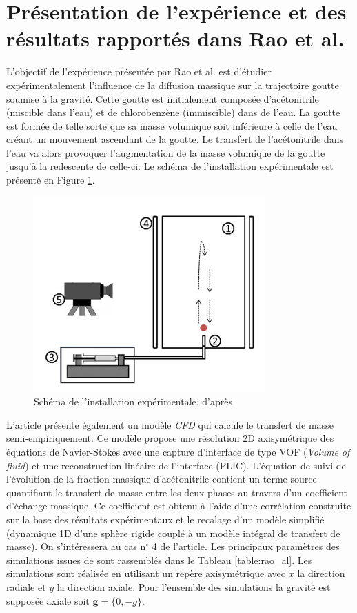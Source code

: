 \section{Présentation de l'expérience et des résultats rapportés dans Rao et al.  \cite{rao_influence_2015}} \label{sec:presExp}
L'objectif de l'expérience présentée par Rao et al. est d'étudier expérimentalement l'influence de la diffusion massique sur la trajectoire goutte soumise à la gravité. Cette goutte est initialement composée d'acétonitrile (miscible dans l'eau) et de chlorobenzène (immiscible) dans de l'eau. La goutte est formée de telle sorte que sa masse volumique soit inférieure à celle de l'eau créant un mouvement ascendant de la goutte. Le transfert de l'acétonitrile dans l'eau va alors provoquer l'augmentation de la masse volumique de la goutte jusqu'à la redescente de celle-ci. Le schéma de l'installation expérimentale est présenté en Figure \ref{fig:exp}.
\begin{figure}[H]
	\centering
	\includegraphics[width=0.3\linewidth]{figure/exp}
	\caption{Schéma de l'installation expérimentale, d'après \cite{rao_influence_2015}}
	\label{fig:exp}
\end{figure}
L'article présente également un modèle \textit{CFD} qui calcule le transfert de masse semi-empiriquement. Ce modèle propose une résolution 2D axisymétrique des équations de Navier-Stokes avec une capture d'interface de type VOF (\textit{Volume of fluid}) et une reconstruction linéaire de l'interface (PLIC). L'équation de suivi de l'évolution de la fraction massique d'acétonitrile contient un terme source quantifiant le transfert de masse entre les deux phases au travers d'un coefficient d'échange massique. Ce coefficient est obtenu à l'aide d'une corrélation construite sur la base des résultats expérimentaux et le recalage d'un modèle simplifié (dynamique 1D d'une sphère rigide couplé à un modèle intégral de transfert de masse). On s'intéressera au cas n$^\circ$ 4 de l'article. Les principaux paramètres des simulations issues de \cite{rao_influence_2015} sont rassemblés dans le Tableau \ref{table:rao_al}. Les simulations sont réalisée en utilisant un repère axisymétrique avec $x$ la direction radiale et $y$ la direction axiale. Pour l'ensemble des simulations la gravité est supposée axiale soit $\mathbf{g} = \{0,-g\}$.
